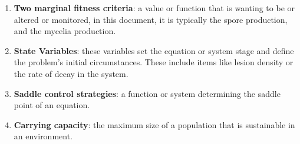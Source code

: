 \documentclass[11pt]{amsart}
\begin{document}
\begin{enumerate}
    \item\label{term:marginal} \textbf{Two marginal fitness criteria}: a value or function that is wanting to be or altered or monitored, in this document, it is typically the spore production, and the mycelia production.
    \item\label{term:statevariables} \textbf{State Variables}: these variables set the equation or system stage and define the problem's initial circumstances. These include items like lesion density or the rate of decay in the system.
    \item\label{term:saddlecontrol} \textbf{Saddle control strategies}: a function or system determining the saddle point of an equation.
    \item\label{term:carryingcapacity} \textbf{Carrying capacity}: the maximum size of a population that is sustainable in an environment.
    
\end{enumerate}
\end{document}

